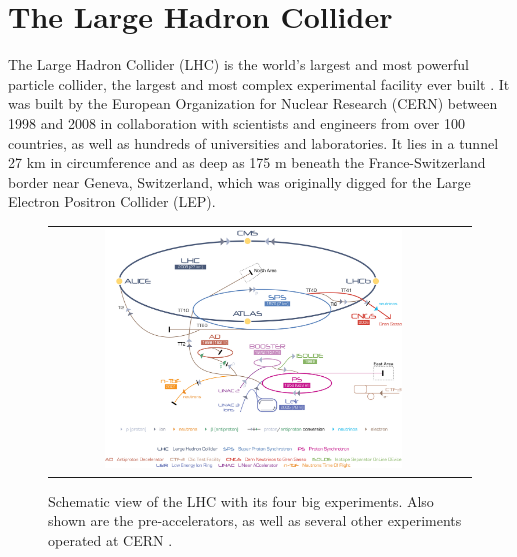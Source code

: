 

\section{The Large Hadron Collider}

The Large Hadron Collider (LHC) is the world's largest and most powerful particle collider, the largest and most complex experimental facility ever built \cite{ipac11:lamont}. It was built by the European Organization for Nuclear Research (CERN) between 1998 and 2008 in collaboration with scientists and engineers from over 100 countries, as well as hundreds of universities and laboratories. It lies in a tunnel 27 km in circumference and as deep as 175 m beneath the France-Switzerland border near Geneva, Switzerland, which was originally digged for the Large Electron Positron Collider (LEP). 

\begin{figure}[tbh!]
	\centering
	\begin{tabular}{cc}
		\includegraphics[width=0.75\textwidth]{detector/pics/CERN_complex.jpg}
	\end{tabular}
	\caption{Schematic view of the LHC with its four big experiments. Also shown are the pre-accelerators, as well as several other experiments operated at CERN \cite{Collider:1998498}.}
	\label{fig:CERN_complex}
\end{figure}

